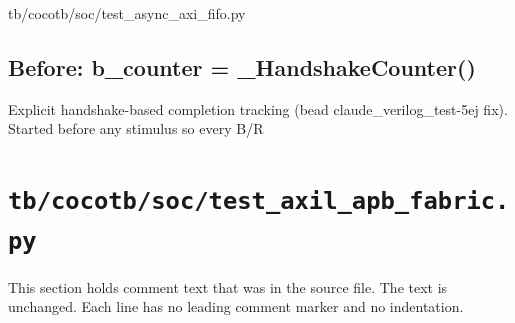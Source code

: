 \begin{relocated}{tb/cocotb/soc/test_async_axi_fifo.py}
\subsection*{Before: b\_counter = \_HandshakeCounter()}

\begin{textblock}
Explicit handshake-based completion tracking (bead
claude_verilog_test-5ej fix). Started before any stimulus so every B/R
\end{textblock}

\end{relocated}

\section{\texttt{tb/cocotb/soc/test\_axil\_apb\_fabric.py}}\label{tm:suite:soc-test-axil-apb-fabric}

This section holds comment text that was in the source file. The text is unchanged. Each line has no leading comment marker and no indentation.

